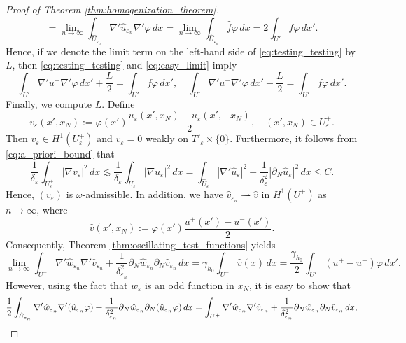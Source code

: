 \documentclass{article}
\numberwithin{equation}{section}
\theoremstyle{definition}
\theoremstyle{remark}
\begin{document}
\begin{proof}[Proof of Theorem \ref{thm:homogenization_theorem}]
\begin{equation}
        = \lim_{n \to \infty} \int_{\hat{U}_{\varepsilon_n}} \nabla' \hat{u}_{\varepsilon_n} \nabla' \varphi \, dx = \lim_{n \to \infty} \int_{\hat{U}_{\varepsilon_n}} \hat{f} \varphi \, dx = 2 \int_{U'} f \varphi \, dx'.
    \end{equation}
    Hence, if we denote the limit term on the left-hand side of \eqref{eq:testing_testing} by $L$, then \eqref{eq:testing_testing} and \eqref{eq:easy_limit} imply
    \begin{equation} \label{eq:primitive_homogenization}
        \int_{U'} \nabla' u^+ \nabla' \varphi \, dx' + \frac{L}{2} = \int_{U'} f \varphi \, dx', \quad \int_{U'} \nabla' u^- \nabla' \varphi \, dx' - \frac{L}{2} = \int_{U'} f \varphi \, dx'.
    \end{equation}
    Finally, we compute $L$. Define
    \[
    v_\varepsilon(x', x_N) := \varphi(x') \frac{u_\varepsilon(x', x_N) - u_\varepsilon(x', -x_N)}{2}, \quad (x', x_N) \in U_\varepsilon^+.
    \]
    Then $v_\varepsilon \in H^1(U_\varepsilon^+)$ and $v_\varepsilon = 0$ weakly on $T'_\varepsilon \times \{0\}$. Furthermore, it follows from \eqref{eq:a_priori_bound} that
    \[
    \frac{1}{\delta_\varepsilon} \int_{U_\varepsilon^+} |\nabla v_\varepsilon|^2 \, dx \lesssim \frac{1}{\delta_\varepsilon} \int_{U_\varepsilon} |\nabla u_\varepsilon|^2 \, dx = \int_{\hat{U}_\varepsilon} |\nabla' \hat{u}_\varepsilon|^2 + \frac{1}{\delta_\varepsilon^2} |\partial_N \hat{u}_\varepsilon|^2 \, dx \le C.
    \]
    Hence, $(v_\varepsilon)$ is $\omega$-admissible. In addition, we have $\hat{v}_{\varepsilon_n} \rightharpoonup \hat{v}$ in $H^1(U^+)$ as $n \to \infty$, where
    \[
    \hat{v}(x', x_N) := \varphi(x')\frac{u^+(x') - u^-(x')}{2}.
    \]
    Consequently, Theorem \ref{thm:oscillating_test_functions} yields
    \[
     \lim_{n \to \infty} \int_{U^+} \nabla' \hat{w}_{\varepsilon_n} \nabla' \hat{v}_{\varepsilon_n} + \frac{1}{\delta_{\varepsilon_n}^2} \partial_N \hat{w}_{\varepsilon_n} \partial_N \hat{v}_{\varepsilon_n} \, dx = \gamma_{h_0} \int_{U^+} \hat{v}(x) \, dx = \frac{\gamma_{h_0}}{2} \int_{U'} (u^+ - u^-) \varphi \, dx'.
    \]
    However, using the fact that $w_\varepsilon$ is an odd function in $x_N$, it is easy to show that
    \begin{equation*}
        \frac{1}{2} \int_{\hat{U}_{\varepsilon_n}} \nabla' \hat{w}_{\varepsilon_n} \nabla' (\hat{u}_{\varepsilon_n} \varphi) + \frac{1}{\delta_{\varepsilon_n}^2} \partial_N \hat{w}_{\varepsilon_n} \partial_N (\hat{u}_{\varepsilon_n} \varphi) \, dx \\
        = \int_{U^+} \nabla' \hat{w}_{\varepsilon_n} \nabla' \hat{v}_{\varepsilon_n} + \frac{1}{\delta_{\varepsilon_n}^2} \partial_N \hat{w}_{\varepsilon_n} \partial_N \hat{v}_{\varepsilon_n} \, dx,

\end{equation*}
\end{proof}
\end{document}
